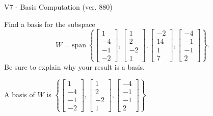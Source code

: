 \begin{exercise}
  \begin{exerciseTitle}V7 - Basis Computation (ver. 880)\end{exerciseTitle}
  \begin{exerciseStatement}
    Find a basis for the subspace 
\[W=\mathrm{span}\ \left\{\left[\begin{array}{r}
1 \\
-4 \\
-1 \\
-2
\end{array}\right] , \left[\begin{array}{r}
1 \\
2 \\
-2 \\
1
\end{array}\right] , \left[\begin{array}{r}
-2 \\
14 \\
1 \\
7
\end{array}\right] , \left[\begin{array}{r}
-4 \\
-1 \\
-1 \\
2
\end{array}\right]\right\}.\]
 Be sure to explain why your result is a basis.


  \end{exerciseStatement}
  \begin{exerciseAnswer}
   A basis of \(W\) is  \(\left\{\left[\begin{array}{r}
1 \\
-4 \\
-1 \\
-2
\end{array}\right] , \left[\begin{array}{r}
1 \\
2 \\
-2 \\
1
\end{array}\right] , \left[\begin{array}{r}
-4 \\
-1 \\
-1 \\
2
\end{array}\right]\right\}\).
  


  \end{exerciseAnswer}
\end{exercise}